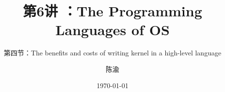


\title[第6讲]{第6讲 ：The Programming Languages of OS} %
\subtitle{第四节：The benefits and costs of writing kernel in a high-level language}
\author{陈渝} %
\date{\today} %




\begin{frame}
\titlepage %
\end{frame}

%
%

